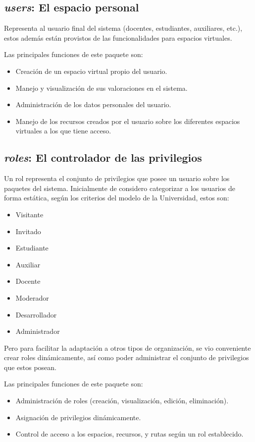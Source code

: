 \subsection{\emph{users}: El espacio personal}
Representa al usuario final del sistema (docentes, estudiantes, auxiliares,
etc.), estos además están provistos de las funcionalidades para espacios
virtuales.

Las principales funciones de este paquete son:

\begin{itemize}
\item Creación de un espacio virtual propio del usuario.
\item Manejo y visualización de sus valoraciones en el sistema.
\item Administración de los datos personales del usuario.
\item Manejo de los recursos creados por el usuario sobre los diferentes
espacios virtuales a los que tiene acceso.
\end{itemize}

\subsection{\emph{roles}: El controlador de las privilegios}
Un rol representa el conjunto de privilegios que posee un usuario sobre los
paquetes del sistema.
Inicialmente de considero categorizar a los usuarios de forma estática, según
los criterios del modelo de la Universidad, estos son:

\begin{itemize}
\item Visitante
\item Invitado
\item Estudiante
\item Auxiliar
\item Docente
\item Moderador
\item Desarrollador
\item Administrador
\end{itemize}

Pero para facilitar la adaptación a otros tipos de organización, se vio
conveniente crear roles dinámicamente, así como poder administrar el conjunto
de privilegios que estos posean.

Las principales funciones de este paquete son:

\begin{itemize}
\item Administración de roles (creación, visualización, edición, eliminación).
\item Asignación de privilegios dinámicamente.
\item Control de acceso a los espacios, recursos, y rutas según un rol
establecido.
\end{itemize}

